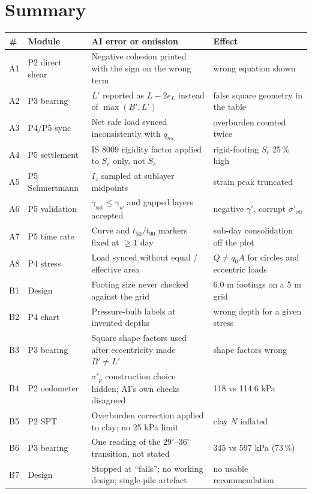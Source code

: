 \documentclass[11pt,a4paper]{article}
\begin{document}
\section{Summary}
{\small
{}
\begin{longtable}{@{}p{}p{}p{}p{}@{}}
\toprule
\textbf{\#} & \textbf{Module} & \textbf{AI error or omission} & \textbf{Effect} \\
\midrule
\endhead
A1 & P2 direct shear & Negative cohesion printed with the sign on the wrong term & wrong equation shown \\
A2 & P3 bearing & $L'$ reported as $L - 2e_L$ instead of $\max(B', L')$ & false square geometry in the table \\
A3 & P4/P5 sync & Net safe load synced inconsistently with $q_{ns}$ & overburden counted twice \\
A4 & P5 settlement & IS 8009 rigidity factor applied to $S_e$ only, not $S_c$ & rigid-footing $S_c$ 25\,\% high \\
A5 & P5 Schmertmann & $I_z$ sampled at sublayer midpoints & strain peak truncated \\
A6 & P5 validation & $\gamma_\text{sat} \le \gamma_w$ and gapped layers accepted & negative $\gamma'$, corrupt $\sigma'_{v0}$ \\
A7 & P5 time rate & Curve and $t_{50}/t_{90}$ markers fixed at $\ge 1$ day & sub-day consolidation off the plot \\
A8 & P4 stress & Load synced without equal / effective area & $Q \ne q_0 A$ for circles and eccentric loads \\
B1 & Design & Footing size never checked against the grid & 6.0 m footings on a 5 m grid \\
B2 & P4 chart & Pressure-bulb labels at invented depths & wrong depth for a given stress \\
B3 & P3 bearing & Square shape factors used after eccentricity made $B' \ne L'$ & shape factors wrong \\
B4 & P2 oedometer & $\sigma'_p$ construction choice hidden; AI's own checks disagreed & 118 vs 114.6 kPa \\
B5 & P2 SPT & Overburden correction applied to clay; no 25 kPa limit & clay $N$ inflated \\
B6 & P3 bearing & One reading of the $29^\circ$--$36^\circ$ transition, not stated & 345 vs 597 kPa (73\,\%) \\
B7 & Design & Stopped at ``fails''; no working design; single-pile artefact & no usable recommendation \\

\end{longtable}}
\end{document}

